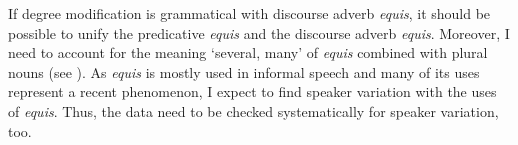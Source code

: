 \documentclass[output=paper]{langsci/langscibook}
\begin{document}
If degree modification is grammatical with discourse adverb \textit{equis}, it should be possible to unify the predicative \textit{equis} and the discourse adverb \textit{equis}. Moreover, I need to account for the meaning ‘several, many’ of \textit{equis} combined with plural nouns (see ).
As \textit{equis} is mostly used in informal speech and many of its uses represent a recent phenomenon, I expect to find speaker variation with the uses of \textit{equis}. Thus, the data need to be checked systematically for speaker variation, too.


{\sloppy\printbibliography[heading=subbibliography,notkeyword=this]}
\end{document}
